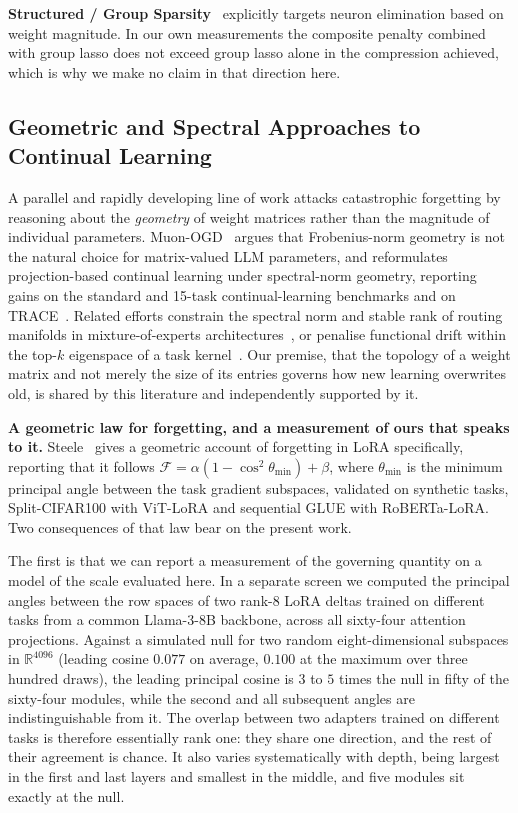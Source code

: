 \documentclass[11pt,a4paper]{article}
\begin{document}
\textbf{Structured / Group Sparsity}~\cite{yuan2006} explicitly targets
neuron elimination based on weight magnitude. In our own measurements the
composite penalty combined with group lasso does not exceed group lasso alone
in the compression achieved, which is why we make no claim in that direction
here.

\subsection{Geometric and Spectral Approaches to Continual Learning}
\label{sec:cl_geometry}

A parallel and rapidly developing line of work attacks catastrophic
forgetting by reasoning about the \emph{geometry} of weight matrices rather
than the magnitude of individual parameters. Muon-OGD~\cite{lu2026muonogd}
argues that Frobenius-norm geometry is not the natural choice for
matrix-valued LLM parameters, and reformulates projection-based continual
learning under spectral-norm geometry, reporting gains on the standard and
15-task continual-learning benchmarks and on
TRACE~\cite{wang2023trace}. Related efforts constrain the spectral norm and
stable rank of routing manifolds in mixture-of-experts
architectures~\cite{srmoe2026}, or penalise functional drift within the
top-$k$ eigenspace of a task kernel~\cite{cflowrank2026}. Our premise, that the
topology of a weight matrix and not merely the size of its entries governs
how new learning overwrites old, is shared by this
literature and independently supported by it.

\textbf{A geometric law for forgetting, and a measurement of ours that speaks
to it.} Steele~\cite{steele2026} gives a geometric account of forgetting in
LoRA specifically, reporting that it follows
$\mathcal{F} = \alpha(1 - \cos^2\theta_{\min}) + \beta$, where
$\theta_{\min}$ is the minimum principal angle between the task gradient
subspaces, validated on synthetic tasks, Split-CIFAR100 with ViT-LoRA and
sequential GLUE with RoBERTa-LoRA. Two consequences of that law bear on the
present work.

The first is that we can report a measurement of the governing quantity on a
model of the scale evaluated here. In a separate screen we computed the
principal angles between the row spaces of two rank-8 LoRA deltas trained on
different tasks from a common Llama-3-8B backbone, across all sixty-four
attention projections. Against a simulated null for two random eight-dimensional
subspaces in $\mathbb{R}^{4096}$ (leading cosine $0.077$ on average, $0.100$ at
the maximum over three hundred draws), the leading principal cosine is $3$ to
$5$ times the null in fifty of the sixty-four modules, while the second and all
subsequent angles are indistinguishable from it. The overlap between two
adapters trained on different tasks is therefore essentially rank one: they
share one direction, and the rest of their agreement is chance. It also varies
systematically with depth, being largest in the first and last layers and
smallest in the middle, and five modules sit exactly at the null.
\end{document}
